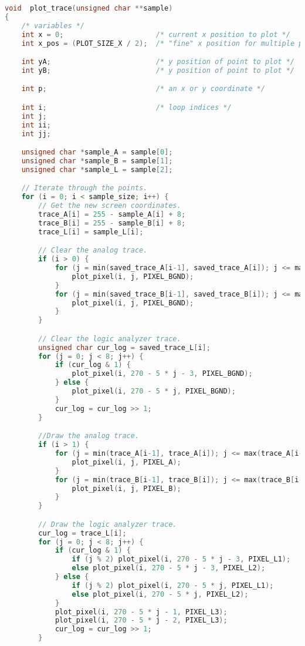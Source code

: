 \begin{lstlisting}[language=C]
void  plot_trace(unsigned char **sample)
{
    /* variables */
    int x = 0;						/* current x position to plot */
    int x_pos = (PLOT_SIZE_X / 2);	/* "fine" x position for multiple point plotting */

    int yA;							/* y position of point to plot */
    int yB;							/* y position of point to plot */

    int p;                          /* an x or y coordinate */

    int i;							/* loop indices */
    int j;
    int ii;
    int jj;

    unsigned char *sample_A = sample[0];
    unsigned char *sample_B = sample[1];
    unsigned char *sample_L = sample[2];

    // Iterate through the points.
    for (i = 0; i < sample_size; i++) {
    	// Get the new screen coordinates.
    	trace_A[i] = 255 - sample_A[i] + 8;
    	trace_B[i] = 255 - sample_B[i] + 8;
    	trace_L[i] = sample_L[i];

    	// Clear the analog trace.
    	if (i > 0) {
			for (j = min(saved_trace_A[i-1], saved_trace_A[i]); j <= max(saved_trace_A[i-1], saved_trace_A[i]); j++) {
				plot_pixel(i, j, PIXEL_BGND);
			}
			for (j = min(saved_trace_B[i-1], saved_trace_B[i]); j <= max(saved_trace_B[i-1], saved_trace_B[i]); j++) {
				plot_pixel(i, j, PIXEL_BGND);
			}
    	}

    	// Clear the logic analyzer trace.
    	unsigned char cur_log = saved_trace_L[i];
    	for (j = 0; j < 8; j++) {
    	    if (cur_log & 1) {
    	    	plot_pixel(i, 270 - 5 * j - 3, PIXEL_BGND);
    	    } else {
    	    	plot_pixel(i, 270 - 5 * j, PIXEL_BGND);
    	    }
    	    cur_log = cur_log >> 1;
    	}

    	//Draw the analog trace.
    	if (i > 1) {
    		for (j = min(trace_A[i-1], trace_A[i]); j <= max(trace_A[i-1], trace_A[i]); j++) {
    		    plot_pixel(i, j, PIXEL_A);
    		}
    		for (j = min(trace_B[i-1], trace_B[i]); j <= max(trace_B[i-1], trace_B[i]); j++) {
    			plot_pixel(i, j, PIXEL_B);
    		}
    	}

    	// Draw the logic analyzer trace.
    	cur_log = trace_L[i];
    	for (j = 0; j < 8; j++) {
    		if (cur_log & 1) {
    			if (j % 2) plot_pixel(i, 270 - 5 * j - 3, PIXEL_L1);
    			else plot_pixel(i, 270 - 5 * j - 3, PIXEL_L2);
    	    } else {
    	    	if (j % 2) plot_pixel(i, 270 - 5 * j, PIXEL_L1);
    	    	else plot_pixel(i, 270 - 5 * j, PIXEL_L2);
    	    }
    		plot_pixel(i, 270 - 5 * j - 1, PIXEL_L3);
    		plot_pixel(i, 270 - 5 * j - 2, PIXEL_L3);
    	    cur_log = cur_log >> 1;
    	}


\end{lstlisting}
